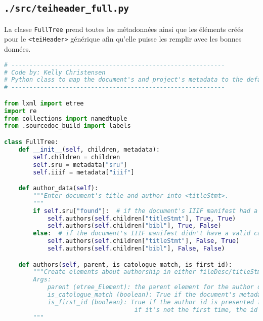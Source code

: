 \documentclass[class=article, crop=false]{standalone}
\begin{document}
\subsection{\texttt{./src/teiheader\_full.py}}
La classe \texttt{FullTree} prend toutes les métadonnées ainsi que les éléments créés pour le \texttt{<teiHeader>} générique afin qu'elle puisse les remplir avec les bonnes données.

\begin{lstlisting}[language=python, style=python]
# -----------------------------------------------------------
# Code by: Kelly Christensen
# Python class to map the document's and project's metadata to the default <teiHeader>.
# -----------------------------------------------------------

from lxml import etree
import re
from collections import namedtuple
from .sourcedoc_build import labels

class FullTree:
    def __init__(self, children, metadata):
        self.children = children
        self.sru = metadata["sru"]
        self.iiif = metadata["iiif"]

    def author_data(self):
        """Enter document's title and author into <titleStmt>.
        """        
        if self.sru["found"]:  # if the document's IIIF manifest had a valid catalogue ARK
            self.authors(self.children["titleStmt"], True, True)
            self.authors(self.children["bibl"], True, False)
        else:  # if the document's IIIF manifest didn't have a valid catalogue ARK
            self.authors(self.children["titleStmt"], False, True)
            self.authors(self.children["bibl"], False, False)

    def authors(self, parent, is_catologue_match, is_first_id):
        """Create elements about authorship in either fileDesc/titleStmt or fileDesc/sourceDesc/bibl.
        Args:
            parent (etree_Element): the parent element for the author data (<titleStmt> or <bibl>)
            is_catologue_match (boolean): True if the document's metadata was found in the BnF catalogue
            is_first_id (boolean): True if the author id is presented for the first time, aka "xml:id"
                                    if it's not the first time, the id will be "ref"
        """     


\end{lstlisting}
\end{document}
